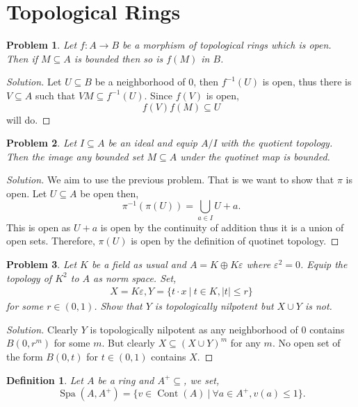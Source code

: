 \documentclass[8pt]{article}
\numberwithin{equation}{section}
\newenvironment{solution}{\begin{proof}[Solution]}{\end{proof}}
\newtheorem{definition}{Definition}[section]
\newtheorem{problem}{Problem}[section]
\DeclareMathOperator{\Spa}{Spa}
\DeclareMathOperator{\Cont}{Cont}
\newcommand{\sep}[0]{\:|\:}
\newcommand{\ab}[1]{\vert #1 \vert}
\begin{document}
\section{Topological Rings}
\begin{problem}
  Let $f:A\to B$ be a morphism of topological rings which is open. Then if $M\subseteq A$ is bounded then so is $f(M)$ in $B$.
\end{problem}
\begin{solution}
  Let $U\subseteq B$ be a neighborhood of $0$, then $f^{-1}(U)$ is open, thus there is $V\subseteq A$ such that $VM\subseteq f^{-1}(U)$. Since $f(V)$ is open, 
  \begin{equation*}
    f(V)f(M)\subseteq U
  \end{equation*}
  will do.
\end{solution}
\begin{problem}
  Let $I\subseteq A$ be an ideal and equip $A/I$ with the quotient topology. Then the image any bounded set $M\subseteq A$ under the quotinet map is bounded.
\end{problem}
\begin{solution}
  We aim to use the previous problem. That is we want to show that $\pi$ is open. Let $U\subseteq A$ be open then,
  \begin{equation*}
    \pi^{-1}(\pi(U)) = \bigcup_{a\in I}U+a.
  \end{equation*}
  This is open as $U+a$ is open by the continuity of addition thus it is a union of open sets. Therefore, $\pi(U)$ is open by the definition of quotinet topology.
\end{solution}
\begin{problem}
  Let $K$ be a field as usual and $A = K\oplus K\varepsilon$ where $\varepsilon^2 = 0$. Equip the topology of $K^2$ to $A$ as norm space. Set,
  \begin{align*}
    X = K\varepsilon, Y = \{t\cdot x\sep t\in K,\ab{t}\leq r\}
  \end{align*}
  for some $r\in(0,1)$. Show that $Y$ is topologically nilpotent but $X\cup Y$ is not.
\end{problem}
\begin{solution}
  Clearly $Y$ is topologically nilpotent as any neighborhood of $0$ contains $B(0,r^m)$ for some $m$. But clearly $X\subseteq (X\cup Y)^m$ for any $m$. No open set of the form $B(0,t)$ for $t\in(0,1)$ contains $X$.
\end{solution}
\begin{definition}
  Let $A$ be a ring and $A^+\subseteq$, we set,
  \begin{equation*}
    \Spa(A,A^+) = \{v\in\Cont(A)\sep \forall a\in A^+,v(a)\leq 1\}.
  \end{equation*}
\end{definition}
\end{document}
